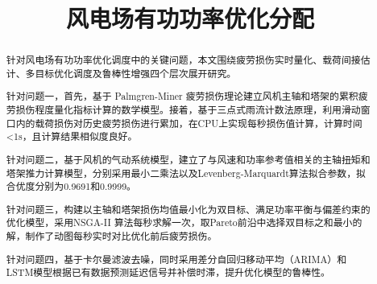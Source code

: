 \documentclass[bwprint]{gmcmthesis}
\title{风电场有功功率优化分配}
\numberwithin{figure}{section}
\begin{document}
 \maketitle
\begin{abstract}
	针对风电场有功功率优化调度中的关键问题，本文围绕疲劳损伤实时量化、载荷间接估计、多目标优化调度及鲁棒性增强四个层次展开研究。
	\par 针对问题一，首先，基于 Palmgren-Miner 疲劳损伤理论建立风机主轴和塔架的累积疲劳损伤程度量化指标计算的数学模型。接着，基于三点式雨流计数法原理，利用滑动窗口内的载荷损伤对历史疲劳损伤进行累加，在CPU上实现每秒损伤值计算，计算时间<1s，且计算结果相似度良好。
	\par 针对问题二，基于风机的气动系统模型，建立了与风速和功率参考值相关的主轴扭矩和塔架推力计算模型，分别采用最小二乘法以及Levenberg-Marquardt算法拟合参数，拟合优度分别为0.9691和0.9999。
	\par 针对问题三，构建以主轴和塔架损伤均值最小化为双目标、满足功率平衡与偏差约束的优化模型，采用NSGA-II 算法每秒求解一次，取Pareto前沿中选择双目标之和最小的解，制作了动图每秒实时对比优化前后疲劳损伤。
	\par 针对问题四，基于卡尔曼滤波去噪，同时采用差分自回归移动平均（ARIMA）和 LSTM模型根据已有数据预测延迟信号并补偿时滞，提升优化模型的鲁棒性。

\end{abstract}
\tableofcontents
\newpage
\end{document}
